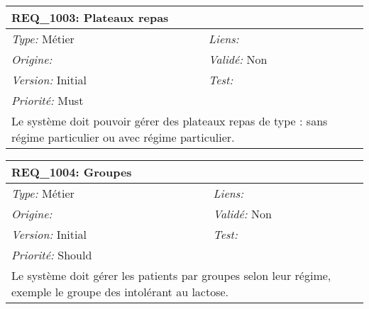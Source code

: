 \begin{table}[!h]

\begin{tabular}{|p{60mm}p{100mm}|}

\hline

\multicolumn{2}{|l|}{\textbf{REQ\_1003:} Plateaux repas} \\ \hline

\emph{Type:} Métier & \emph{Liens:}  \\

\emph{Origine:}  & \emph{Validé:} Non \\

\emph{Version:} Initial & \emph{Test:}  \\

\emph{Priorité:} Must & \\ \hline

\multicolumn{2}{|p{16cm}|}{Le système doit pouvoir gérer des plateaux repas de type : sans régime particulier ou avec régime particulier.} \\ \hline

\end{tabular}

\end{table}



\begin{table}[!h]

\begin{tabular}{|p{60mm}p{100mm}|}

\hline

\multicolumn{2}{|l|}{\textbf{REQ\_1004:} Groupes} \\ \hline

\emph{Type:} Métier & \emph{Liens:}  \\

\emph{Origine:}  & \emph{Validé:} Non \\

\emph{Version:} Initial & \emph{Test:}  \\

\emph{Priorité:} Should & \\ \hline

\multicolumn{2}{|p{16cm}|}{Le système doit gérer les patients par groupes selon leur régime, exemple le groupe des intolérant au lactose.} \\ \hline

\end{tabular}

\end{table}



